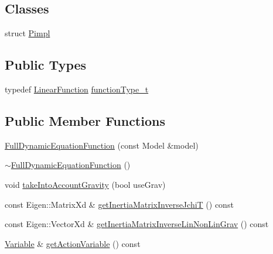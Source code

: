 \subsection*{Classes}
\begin{DoxyCompactItemize}
\item 
struct \hyperlink{structFullDynamicEquationFunction_1_1Pimpl}{Pimpl}
\end{DoxyCompactItemize}
\subsection*{Public Types}
\begin{DoxyCompactItemize}
\item 
typedef \hyperlink{classocra_1_1LinearFunction}{Linear\+Function} \hyperlink{group__constraint_ga3f72eb3c4529d2c19ef39928f5e57262}{function\+Type\+\_\+t}
\end{DoxyCompactItemize}
\subsection*{Public Member Functions}
\begin{DoxyCompactItemize}
\item 
\hyperlink{group__constraint_ga778bffa6d85a494b3ee0c499400573a6}{Full\+Dynamic\+Equation\+Function} (const Model \&model)
\item 
\hyperlink{group__constraint_gab3c2d35bef3c4d8733b7ab0e9ff48bfc}{$\sim$\+Full\+Dynamic\+Equation\+Function} ()
\item 
void \hyperlink{group__constraint_ga673fd9a47a249d84ce527011a06417aa}{take\+Into\+Account\+Gravity} (bool use\+Grav)
\item 
const Eigen\+::\+Matrix\+Xd \& \hyperlink{group__constraint_gaf2529ade8eb0c03afaaed34a4e82e144}{get\+Inertia\+Matrix\+Inverse\+JchiT} () const
\item 
const Eigen\+::\+Vector\+Xd \& \hyperlink{group__constraint_ga6d0c4ebdceec4ea4569266155ca41172}{get\+Inertia\+Matrix\+Inverse\+Lin\+Non\+Lin\+Grav} () const
\item 
\hyperlink{classocra_1_1Variable}{Variable} \& \hyperlink{group__constraint_gaa3c3057ca6a00bf88c372d0c467bed67}{get\+Action\+Variable} () const
\end{DoxyCompactItemize}
